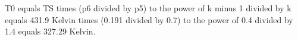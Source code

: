 T0 equals TS times (p6 divided by p5) to the power of k minus 1 divided by k equals 431.9 Kelvin times (0.191 divided by 0.7) to the power of 0.4 divided by 1.4 equals 327.29 Kelvin.
